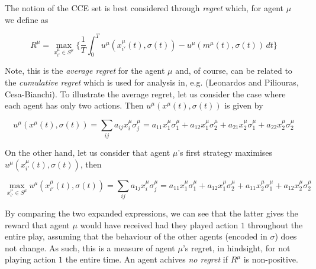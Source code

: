 \documentclass{article}
\theoremstyle{definition}
\newtheorem*{definition}{Definition}
\begin{document}
	The notion of the CCE set is best considered through \emph{regret} which, for agent $\mu$ we define as

	\begin{equation}
		R^{\mu} = \max_{x_{i'}^\mu \in S^\mu} \Big\{ \frac{1}{T} \int_{0}^{T} u^{\mu}(x_{i'}^\mu(t), \sigma(t)) - u^{\mu}(m^\mu(t), \sigma(t)) \, dt \Big\}
	\end{equation}

	Note, this is the \emph{average regret} for the agent $\mu$ and, of course, can be related to the \emph{cumulative regret} which is used for analysis in, e.g. (Leonardos and Piliouras, Cesa-Bianchi). To illustrate the average regret, let us consider the case where each agent has only two actions. Then $u^{\mu}(x^\mu(t), \sigma(t))$ is given by
	
	\begin{equation}
		u^{\mu}(x^\mu(t), \sigma(t)) = \sum_{ij} a_{ij} x_i^\mu \sigma_j^\mu = a_{11} x_1^\mu \sigma_1^\mu + a_{12} x_1^\mu \sigma_2^\mu + a_{21} x_2^\mu \sigma_1^\mu + a_{22} x_2^\mu \sigma_2^\mu
	\end{equation}

	On the other hand, let us consider that agent $\mu$'s first strategy maximises $u^{\mu}(x_{i'}^\mu(t), \sigma(t))$, then

	\begin{equation}
		\max_{x_{i'}^\mu \in S^\mu} u^{\mu}(x_{i'}^\mu(t), \sigma(t)) = \sum_{ij} a_{1j} x_i^\mu \sigma_j^\mu = a_{11} x_1^\mu \sigma_1^\mu + a_{12} x_1^\mu \sigma_2^\mu + a_{11} x_2^\mu \sigma_1^\mu + a_{12} x_2^\mu \sigma_2^\mu 
	\end{equation}

	By comparing the two expanded expressions, we can see that the latter gives the reward that agent $\mu$ would have received had they played action $1$ throughout the entire play, assuming that the behaviour of the other agents (encoded in $\sigma$) does not change. As such, this is a measure of agent $\mu$'s regret, in hindsight, for not playing action $1$ the entire time. An agent achives \emph{no regret} if $R^\mu$ is non-positive.

\end{document}
